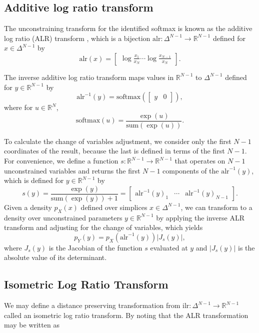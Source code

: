 \documentclass[11pt]{article}
\newcommand{\abs}[1]{\left| #1 \right|}
\newcommand{\absdet}[1]{\abs{#1}}
\begin{document}
\subsection{Additive log ratio transform}

The unconstraining transform for the identified softmax is known as
the additive log ratio (ALR) transform
\cite{aitchison1982statistical}, which is a bijection
$\textrm{alr}:\Delta^{N-1} \rightarrow \mathbb{R}^{N-1}$ defined for
$x \in \Delta^{N-1}$ by
\[
  \textrm{alr}(x)
  = \begin{bmatrix}\displaystyle
    \log \frac{x_1}{x_N} \cdots \log \frac{x_{N-1}}{x_N}
  \end{bmatrix}.
\]

The inverse additive log ratio transform maps values in
$\mathbb{R}^{N-1}$ to $\Delta^{N-1}$ defined for $y \in
\mathbb{R}^{N-1}$ by
\[
  \textrm{alr}^{-1}(y)
  = \textrm{softmax}(\begin{bmatrix} y &  0 \end{bmatrix}),
\]
where for $u \in \mathbb{R}^N$,
\[
  \textrm{softmax}(u) = \frac{\exp(u)}{\textrm{sum}(\exp(u))}.
\]

To calculate the change of variables adjustment, we consider only the
first $N-1$ coordinates of the result, because the last is defined in
terms of the first $N-1$.  For convenience, we define a function 
$s:\mathbb{R}^{N-1} \rightarrow \mathbb{R}^{N-1}$ that operates on
$N-1$ unconstrained variables and returns the first $N-1$ components
of the $\textrm{alr}^{-1}(y)$, which is
defined for $y \in \mathbb{R}^{N-1}$ by
\[
  s(y) = \frac{\exp(y)}{\textrm{sum}(\exp(y)) + 1}
  = \begin{bmatrix}
    \textrm{alr}^{-1}(y)_1
    & \cdots &
    \textrm{alr}^{-1}(y)_{N-1}
    \end{bmatrix}.
\]
Given a density $p_X(x)$ defined over simplices $x \in \Delta^{N-1}$,
we can transform to a density over unconstrained parameters $y \in
\mathbb{R}^{N-1}$ by applying the inverse ALR transform and adjusting
for the change of variables, which yields
\[
  p_Y(y) = p_X(\textrm{alr}^{-1}(y)) \absdet{J_{s}(y)},
\]
where $J_{s}(y)$ is the Jacobian of the function $s$ evaluated at $y$
and $\absdet{J_s(y)}$ is the absolute value of its determinant.

\subsection{Isometric Log Ratio Transform}

We may define a distance preserving transformation from $\textrm{ilr}:\Delta^{N-1} \rightarrow \mathbb{R}^{N-1}$ called an isometric log ratio transform. By noting that the ALR transformation may be written as
\end{document}
